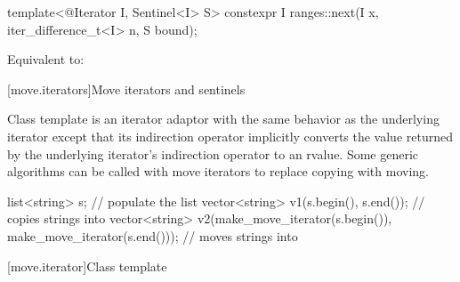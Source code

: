 \documentclass{wg21}
\begin{document}
%
\begin{itemdecl}
	template<@Iterator I, Sentinel<I> S>
	constexpr I ranges::next(I x, iter_difference_t<I> n, S bound);
\end{itemdecl}

\begin{itemdescr}
	\pnum
	\effects Equivalent to: 
\end{itemdescr}


[move.iterators]{Move iterators and sentinels}

\pnum
Class template  is an iterator adaptor
with the same behavior as the underlying iterator except that its
indirection operator implicitly converts the value returned by the
underlying iterator's indirection operator to an rvalue.
Some generic algorithms can be called with move iterators to replace
copying with moving.

\pnum
\begin{example}
	
	\begin{codeblock}
		list<string> s;
		// populate the list 
		vector<string> v1(s.begin(), s.end());          // copies strings into 
		vector<string> v2(make_move_iterator(s.begin()),
		make_move_iterator(s.end())); // moves strings into 
	\end{codeblock}
	
\end{example}

[move.iterator]{Class template }
\end{document}
